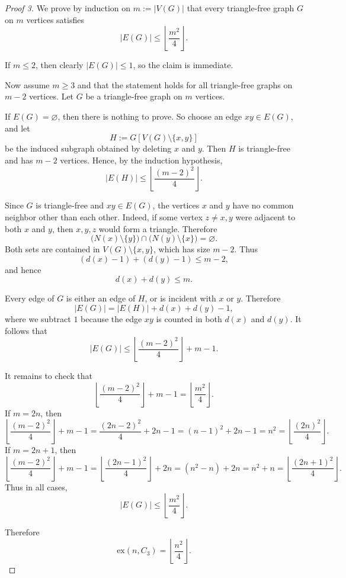 \documentclass[11pt, a4paper]{ctexrep}
\begin{document}
\begin{proof}[Proof 3]
    We prove by induction on $m:=|V(G)|$ that every triangle-free graph $G$ on $m$ vertices satisfies
    \[
        |E(G)|\le \left\lfloor \frac{m^{2}}{4}\right\rfloor .
    \]

    If $m\le 2$, then clearly $|E(G)|\le 1$, so the claim is immediate.

    Now assume $m\ge 3$ and that the statement holds for all triangle-free graphs on $m-2$ vertices. Let $G$ be a triangle-free graph on $m$ vertices.

    If $E(G)=\varnothing$, then there is nothing to prove. So choose an edge $xy\in E(G)$, and let
    \[
        H:=G[V(G)\setminus\{x,y\}]
    \]
    be the induced subgraph obtained by deleting $x$ and $y$. Then $H$ is triangle-free and has $m-2$ vertices. Hence, by the induction hypothesis,
    \[
        |E(H)|\le \left\lfloor \frac{(m-2)^2}{4}\right\rfloor .
    \]

    Since $G$ is triangle-free and $xy\in E(G)$, the vertices $x$ and $y$ have no common neighbor other than each other. Indeed, if some vertex $z\neq x,y$ were adjacent to both $x$ and $y$, then $x,y,z$ would form a triangle. Therefore
    \[
        \bigl(N(x)\setminus\{y\}\bigr)\cap \bigl(N(y)\setminus\{x\}\bigr)=\varnothing.
    \]
    Both sets are contained in $V(G)\setminus\{x,y\}$, which has size $m-2$. Thus
    \[
        (d(x)-1)+(d(y)-1)\le m-2,
    \]
    and hence
    \[
        d(x)+d(y)\le m.
    \]

    Every edge of $G$ is either an edge of $H$, or is incident with $x$ or $y$. Therefore
    \[
        |E(G)|=|E(H)|+d(x)+d(y)-1,
    \]
    where we subtract $1$ because the edge $xy$ is counted in both $d(x)$ and $d(y)$. It follows that
    \[
        |E(G)|
        \le
        \left\lfloor \frac{(m-2)^2}{4}\right\rfloor + m - 1.
    \]

    It remains to check that
    \[
        \left\lfloor \frac{(m-2)^2}{4}\right\rfloor + m - 1
        =
        \left\lfloor \frac{m^2}{4}\right\rfloor .
    \]
    If $m=2n$, then
    \[
        \left\lfloor \frac{(m-2)^2}{4}\right\rfloor + m - 1
        =
        \frac{(2n-2)^2}{4}+2n-1
        =
        (n-1)^2+2n-1
        =
        n^2
        =
        \left\lfloor \frac{(2n)^2}{4}\right\rfloor .
    \]
    If $m=2n+1$, then
    \[
        \left\lfloor \frac{(m-2)^2}{4}\right\rfloor + m - 1
        =
        \left\lfloor \frac{(2n-1)^2}{4}\right\rfloor +2n
        =
        (n^2-n)+2n
        =
        n^2+n
        =
        \left\lfloor \frac{(2n+1)^2}{4}\right\rfloor .
    \]
    Thus in all cases,
    \[
        |E(G)|\le \left\lfloor \frac{m^2}{4}\right\rfloor .
    \]

    Therefore
    \[
        \mathrm{ex}(n,C_3)=\left\lfloor \frac{n^2}{4}\right\rfloor .
    \]
\end{proof}
\end{document}
